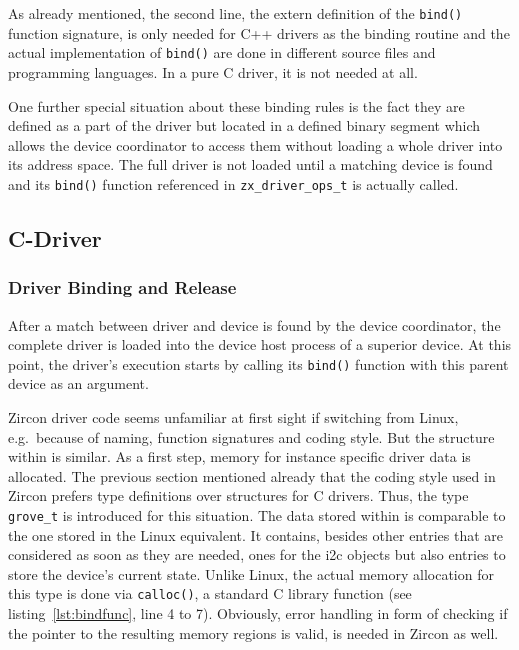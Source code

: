 As already mentioned, the second line, the extern definition of the \texttt{bind()} function signature, is only needed for C++ drivers as the binding routine and the actual implementation of  \texttt{bind()} are done in different source files and programming languages.
In a pure C driver, it is not needed at all.

One further special situation about these binding rules is the fact they are defined as a part of the driver but located in a defined binary segment which allows the device coordinator to access them without loading a whole driver into its address space.
The full driver is not loaded until a matching device is found and its \texttt{bind()} function referenced in \texttt{zx_driver_ops_t} is actually called.

\subsection{C-Driver}

\subsubsection{Driver Binding and Release}\label{sec:zircon:drv:bind}
After a match between driver and device is found by the device coordinator, the complete driver is loaded into the device host process of a superior device.
At this point, the driver's execution starts by calling its \texttt{bind()} function with this parent device as an argument.

Zircon driver code seems unfamiliar at first sight if switching from Linux, e.g.\ because of naming, function signatures and coding style.
But the structure within is similar.
As a first step, memory for instance specific driver data is allocated.
The previous section mentioned already that the coding style used in Zircon prefers type definitions over structures for C drivers. 
Thus, the type \texttt{grove_t} is introduced for this situation.
The data stored within is comparable to the one stored in the Linux equivalent.
It contains, besides other entries that are considered as soon as they are needed, ones for the \ac{i2c} objects but also entries to store the device's current state.
Unlike Linux, the actual memory allocation for this type is done via \texttt{calloc()}, a standard C library function (see listing~\ref{lst:bindfunc}, line 4 to 7).
Obviously, error handling in form of checking if the pointer to the resulting memory regions is valid, is needed in Zircon as well.

